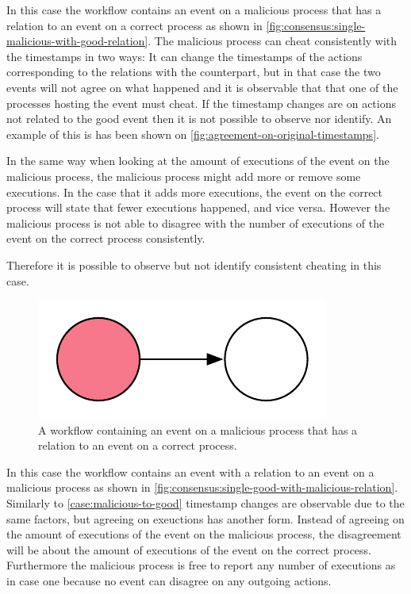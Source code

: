 	\begin{case}
		In this case the workflow contains an event on a malicious process that has a relation to an event on a correct process as shown in \autoref{fig:consensus:single-malicious-with-good-relation}. The malicious process can cheat consistently with the timestamps in two ways: It can change the timestamps of the actions corresponding to the relations with the counterpart, but in that case the two events will not agree on what happened and it is observable that that one of the processes hosting the event must cheat. If the timestamp changes are on actions not related to the good event then it is not possible to observe nor identify. An example of this is has been shown on \autoref{fig:agreement-on-original-timestamps}.
		
		In the same way when looking at the amount of executions of the event on the malicious process, the malicious process might add more or remove some executions. In the case that it adds more executions, the event on the correct process will state that fewer executions happened, and vice versa. However the malicious process is not able to disagree with the number of executions of the event on the correct process consistently. 
		
		Therefore it is possible to observe but not identify consistent cheating in this case. 
		\label{case:malicious-to-good}
	\end{case}

	\begin{figure}[H]
		\centering
		\includegraphics[]{5validation/images/3.pdf}
		\caption{A workflow containing an event on a malicious process that has a relation to an event on a correct process.}
		\label{fig:consensus:single-malicious-with-good-relation}
	\end{figure}
	
	\begin{case}
		In this case the workflow contains an event with a relation to an event on a malicious process as shown in \autoref{fig:consensus:single-good-with-malicious-relation}. Similarly to \autoref{case:malicious-to-good} timestamp changes are observable due to the same factors, but agreeing on exeuctions has another form. Instead of agreeing on the amount of executions of the event on the malicious process, the disagreement will be about the amount of executions of the event on the correct process. Furthermore the malicious process is free to report any number of executions as in case one because no event can disagree on any outgoing actions. 
		\label{case:good-to-malicious}
	\end{case}
	 
